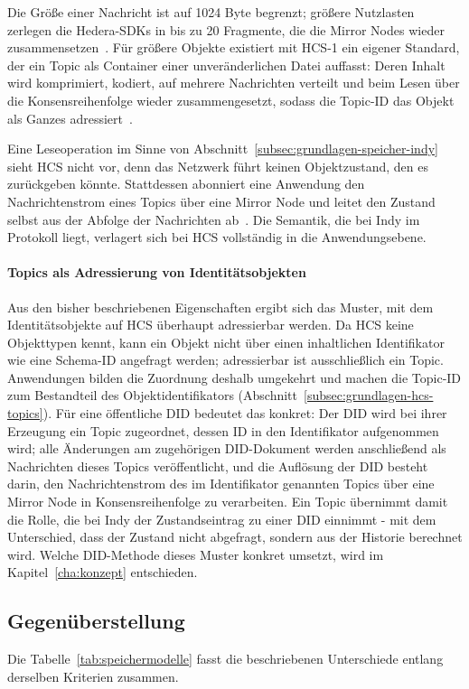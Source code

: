 Die Größe einer Nachricht ist auf 1024 Byte begrenzt; größere Nutzlasten zerlegen die Hedera-SDKs in bis zu 20 Fragmente, die die Mirror Nodes wieder zusammensetzen~\cite{hederasubmitmessage}. Für größere Objekte existiert mit HCS-1 ein eigener Standard, der ein Topic als Container einer unveränderlichen Datei auffasst: Deren Inhalt wird komprimiert, kodiert, auf mehrere Nachrichten verteilt und beim Lesen über die Konsensreihenfolge wieder zusammengesetzt, sodass die Topic-ID das Objekt als Ganzes adressiert~\cite{hcs1standard}.

Eine Leseoperation im Sinne von Abschnitt~\ref{subsec:grundlagen-speicher-indy} sieht HCS nicht vor, denn das Netzwerk führt keinen Objektzustand, den es zurückgeben könnte. Stattdessen abonniert eine Anwendung den Nachrichtenstrom eines Topics über eine Mirror Node und leitet den Zustand selbst aus der Abfolge der Nachrichten ab~\cite{bairdgross2019}. Die Semantik, die bei Indy im Protokoll liegt, verlagert sich bei HCS vollständig in die Anwendungsebene.

\paragraph{Topics als Adressierung von Identitätsobjekten}
Aus den bisher beschriebenen Eigenschaften ergibt sich das Muster, mit dem Identitätsobjekte auf HCS überhaupt adressierbar werden. Da HCS keine Objekttypen kennt, kann ein Objekt nicht über einen inhaltlichen Identifikator wie eine Schema-ID angefragt werden; adressierbar ist ausschließlich ein Topic. Anwendungen bilden die Zuordnung deshalb umgekehrt und machen die Topic-ID zum Bestandteil des Objektidentifikators (Abschnitt~\ref{subsec:grundlagen-hcs-topics}). Für eine öffentliche DID bedeutet das konkret: Der DID wird bei ihrer Erzeugung ein Topic zugeordnet, dessen ID in den Identifikator aufgenommen wird; alle Änderungen am zugehörigen DID-Dokument werden anschließend als Nachrichten dieses Topics veröffentlicht, und die Auflösung der DID besteht darin, den Nachrichtenstrom des im Identifikator genannten Topics über eine Mirror Node in Konsensreihenfolge zu verarbeiten. Ein Topic übernimmt damit die Rolle, die bei Indy der Zustandseintrag zu einer DID einnimmt - mit dem Unterschied, dass der Zustand nicht abgefragt, sondern aus der Historie berechnet wird. Welche DID-Methode dieses Muster konkret umsetzt, wird im Kapitel~\ref{cha:konzept} entschieden.

\subsection{Gegenüberstellung}
\label{subsec:grundlagen-speicher-vergleich}
Die Tabelle~\ref{tab:speichermodelle} fasst die beschriebenen Unterschiede entlang derselben Kriterien zusammen.

